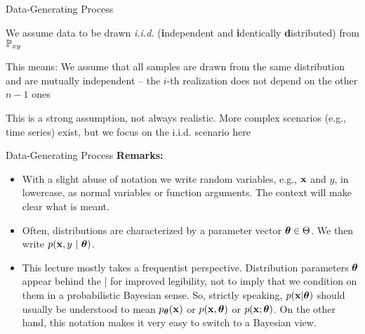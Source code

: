 \documentclass[11pt,compress,t,notes=noshow, xcolor=table]{beamer}
\begin{document}
\begin{framei}{Data-Generating Process}
\item We assume data to be drawn \emph{i.i.d.} (\textbf{i}ndependent and \textbf{i}dentically \textbf{d}istributed) from $\mathbb{P}_{xy}$
\item This means: We assume that all samples are drawn from the same distribution and are mutually independent -- the $i$-th realization does not depend on the other $n-1$ ones
\item This is a strong assumption, not always realistic.
More complex scenarios (e.g., time series) exist, but we focus on the i.i.d. scenario here
\vfill
{}
\end{framei}


\begin{frame2}{Data-Generating Process}
\textbf{Remarks:}
\begin{itemize}
\item With a slight abuse of notation we write random variables, e.g., $\mathbf{x}$ and $y$, in lowercase, as normal variables or function arguments. 
The context will make clear what is meant.
\item Often, distributions are characterized by a parameter vector $\bm{\theta} \in \Theta$. We then write $p(\mathbf{x}, y ~|~ \bm{\theta})$.
\item This lecture mostly takes a frequentist perspective. Distribution parameters $\bm{\theta}$ appear behind the | for improved legibility, not to imply that we condition on them in a probabilistic Bayesian sense.
So, strictly speaking, $p(\mathbf{x} | \bm{\theta})$ should usually be understood to mean $p_{\bm{\theta}}(\mathbf{x})$ or $p(\mathbf{x}, \bm{\theta})$ or $p(\mathbf{x}; \bm{\theta})$.
On the other hand, this notation makes it very easy to switch to a Bayesian view.
\end{itemize}
\end{frame2}

\endlecture
\end{document}

